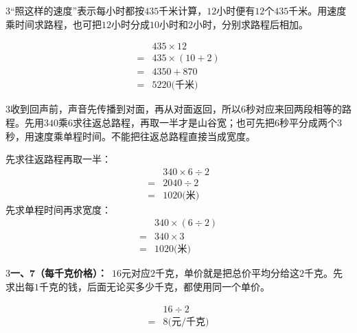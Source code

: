 \documentclass[multi=snippet,border={5bp 20bp 5bp 5bp}]{standalone}
\newenvironment{snippet}[3]{\begin{minipage}{#1bp}\color{answerred}\fontsize{#2}{#3}\selectfont\raggedright}{\end{minipage}}
\begin{document}
\begin{snippet}{505}{11.5}{14}\begin{multicols}{3}\raggedcolumns “照这样的速度”表示每小时都按\(435\)\allowbreak 千米计算，\(12\)\allowbreak 小时便有\(12\)\allowbreak 个\(435\)\allowbreak 千米。用速度乘时间求路程，也可把\(12\)\allowbreak 小时分成\(10\)\allowbreak 小时和\(2\)\allowbreak 小时，分别求路程后相加。\par \[\begin{aligned}&435\times12\\={}&435\times(10+2)\\={}&4350+870\\={}&5220\text{(千米)}\end{aligned}\]\end{multicols}\end{snippet}
\begin{snippet}{505}{11.5}{14}\begin{multicols}{3}\raggedcolumns 收到回声前，声音先传播到对面，再从对面返回，所以\(6\)\allowbreak 秒对应来回两段相等的路程。先用\(340\)\allowbreak 乘\(6\)\allowbreak 求往返总路程，再取一半才是山谷宽；也可先把\(6\)\allowbreak 秒平分成两个\(3\)\allowbreak 秒，用速度乘单程时间。不能把往返总路程直接当成宽度。\par 先求往返路程再取一半：\[\begin{aligned}&340\times6\div2\\={}&2040\div2\\={}&1020\text{(米)}\end{aligned}\]先求单程时间再求宽度：\[\begin{aligned}&340\times(6\div2)\\={}&340\times3\\={}&1020\text{(米)}\end{aligned}\]\end{multicols}\end{snippet}
\begin{snippet}{505}{11.5}{14}\begin{multicols}{3}\raggedcolumns \textbf{一、7（每千克价格）：}\ \(16\)\allowbreak 元对应\(2\)\allowbreak 千克，单价就是把总价平均分给这\(2\)\allowbreak 千克。先求出每\(1\)\allowbreak 千克的钱，后面无论买多少千克，都使用同一个单价。\par \[\begin{aligned}&16\div2\\={}&8\text{(元/千克)}\end{aligned}\]\end{multicols}\end{snippet}
\end{document}
